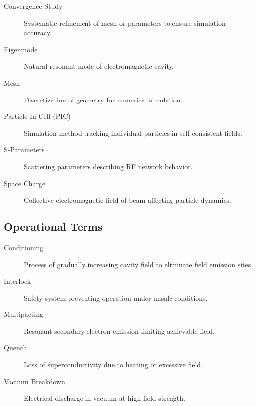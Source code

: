 \begin{description}
\item[Convergence Study] Systematic refinement of mesh or parameters to ensure simulation accuracy.

\item[Eigenmode] Natural resonant mode of electromagnetic cavity.

\item[Mesh] Discretization of geometry for numerical simulation.

\item[Particle-In-Cell (PIC)] Simulation method tracking individual particles in self-consistent fields.

\item[S-Parameters] Scattering parameters describing RF network behavior.

\item[Space Charge] Collective electromagnetic field of beam affecting particle dynamics.
\end{description}

\subsection{Operational Terms}

\begin{description}
\item[Conditioning] Process of gradually increasing cavity field to eliminate field emission sites.

\item[Interlock] Safety system preventing operation under unsafe conditions.

\item[Multipacting] Resonant secondary electron emission limiting achievable field.

\item[Quench] Loss of superconductivity due to heating or excessive field.

\item[Vacuum Breakdown] Electrical discharge in vacuum at high field strength.
\end{description}